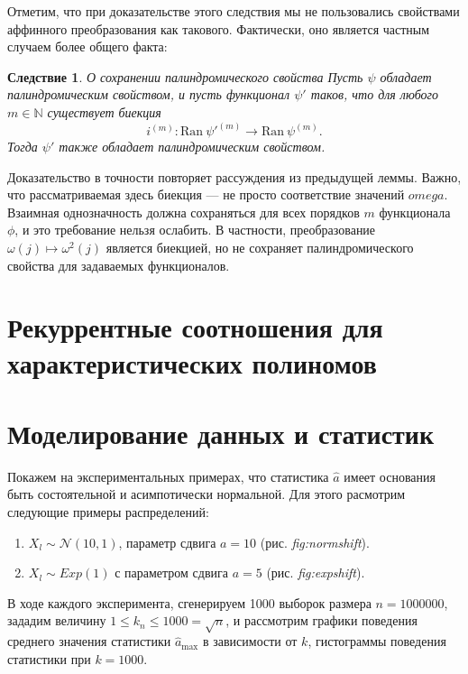 \documentclass[14pt, a4paper, russian]{report}
\newtheorem{corollary}{\indent Следствие}
\begin{document}
Отметим, что при доказательстве этого следствия мы не пользовались свойствами аффинного преобразования как такового. Фактически, оно является частным случаем более общего факта:
\begin{corollary}{О сохранении палиндромического свойства}
Пусть $\psi$ обладает палиндромическим свойством, и пусть функционал $\psi'$ таков, что для любого $m \in \mathbb{N}$ существует биекция $$i^{(m)}: \mathrm{Ran}\ \psi'^{(m)} \rightarrow \mathrm {Ran}\ \psi^{(m)}.$$ Тогда $\psi'$ также обладает палиндромическим свойством.
\end{corollary}
Доказательство в точности повторяет рассуждения из предыдущей леммы. Важно, что рассматриваемая здесь биекция --- не просто соответствие значений $omega$. Взаимная однозначность должна сохраняться для всех порядков $m$ функционала $\phi$, и это требование нельзя ослабить. В частности, преобразование $\omega(j) \mapsto \omega^2(j)$ является биекцией, но не сохраняет палиндромического свойства для задаваемых функционалов.
\chapter{Рекуррентные соотношения для характеристических полиномов}

\chapter{Моделирование данных и статистик}

Покажем на экспериментальных примерах, что статистика $\hat{a}$ имеет основания быть состоятельной и асимпотически нормальной. Для этого расмотрим следующие примеры распределений:
\begin{enumerate}
  \item $X_l \sim \mathcal{N}(10, 1)$, параметр сдвига $a = 10$ (рис. \textit{fig:normshift}).
  \item $X_l \sim Exp(1)$ с параметром сдвига $a = 5$ (рис. \textit{fig:expshift}).
\end{enumerate}
В ходе каждого эксперимента, сгенерируем 1000 выборок размера $n = 1000000$, зададим величину $1 \le k_n \le 1000 = \sqrt{n}$, и рассмотрим графики поведения среднего значения статистики $\hat{a}_{\max}$ в зависимости от $k$, гистограммы поведения статистики при $k = 1000$.

\end{document}
